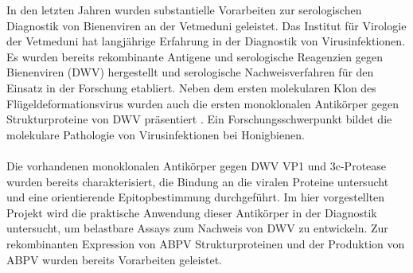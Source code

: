 In den letzten Jahren wurden substantielle Vorarbeiten zur serologischen Diagnostik von Bienenviren an der Vetmeduni geleistet. Das Institut für Virologie der Vetmeduni hat langjährige Erfahrung in der Diagnostik von Virusinfektionen. Es wurden bereits rekombinante Antigene und serologische Reagenzien gegen Bienenviren (DWV) hergestellt und serologische Nachweisverfahren für den Einsatz in der Forschung etabliert. Neben dem ersten molekularen Klon des Flügeldeformationsvirus wurden auch die ersten monoklonalen Antikörper gegen Strukturproteine von DWV präsentiert \citep{Lamp2016}. Ein Forschungsschwerpunkt bildet die molekulare Pathologie von Virusinfektionen bei Honigbienen. 
\\
\\
Die vorhandenen monoklonalen Antikörper gegen DWV VP1 und 3c-Protease wurden bereits charakterisiert, die Bindung an die viralen Proteine untersucht und eine orientierende Epitopbestimmung durchgeführt. Im hier vorgestellten Projekt wird die praktische Anwendung dieser Antikörper in der Diagnostik untersucht, um belastbare Assays zum Nachweis von DWV zu entwickeln. Zur rekombinanten Expression von ABPV Strukturproteinen und der Produktion von ABPV wurden bereits Vorarbeiten geleistet.
